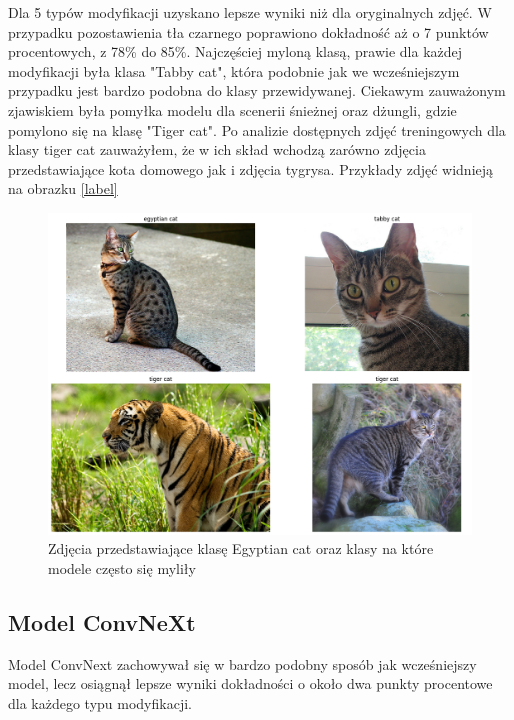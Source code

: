 Dla 5 typów modyfikacji uzyskano lepsze wyniki niż dla oryginalnych zdjęć. W przypadku pozostawienia tła czarnego poprawiono dokładność aż o 7 punktów procentowych, z 78\% do 85\%. Najczęściej myloną klasą, prawie dla każdej modyfikacji była klasa "Tabby cat", która podobnie jak
we wcześniejszym przypadku jest bardzo podobna do klasy przewidywanej. Ciekawym zauważonym zjawiskiem była pomyłka modelu dla scenerii śnieżnej oraz dżungli, gdzie pomylono się na klasę "Tiger cat". Po analizie dostępnych zdjęć treningowych dla klasy tiger cat zauważyłem, że w ich skład 
wchodzą zarówno zdjęcia przedstawiające kota domowego jak i zdjęcia tygrysa. Przykłady zdjęć widnieją na obrazku \ref*{label}

\begin{figure}
	\centering\includegraphics[width=.9\textwidth]{img/285}
	\caption{Zdjęcia przedstawiające klasę Egyptian cat oraz klasy na które modele często się myliły}
	\label{rys:285}
\end{figure}

\subsection*{Model ConvNeXt}

Model ConvNext zachowywał się w bardzo podobny sposób jak wcześniejszy model, lecz osiągnął lepsze wyniki dokładności o około dwa punkty procentowe dla każdego typu modyfikacji.

